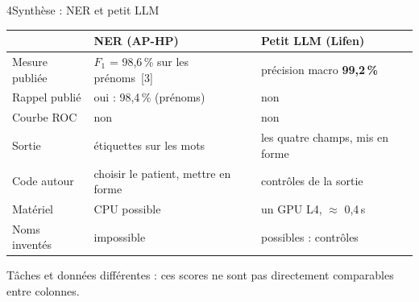 \documentclass[11pt,aspectratio=169]{beamer}
\newcommand{\refs}[1]{{\color{mlblue}[#1]}}
\newcommand{\pct}[1]{#1\,\%}
\newcommand{\remarque}[1]{{\footnotesize\color{mlgray}#1\par}}
\begin{document}
\begin{frame}{4\quad Synthèse : NER et petit LLM}
  \begin{center}
    {\small
    \renewcommand{\arraystretch}{1.15}
    \begin{tabular}{@{}L{2.8cm}L{5.0cm}L{5.0cm}@{}}
      \toprule
      & \textbf{NER (AP-HP)} & \textbf{Petit LLM (Lifen)} \\
      \midrule
      Mesure publiée & $F_1$ = \pct{98,6} sur les prénoms~\refs{3} & précision macro \textbf{\pct{99,2}} \\
      Rappel publié & oui : \pct{98,4} (prénoms) & non \\
      Courbe ROC & non & non \\
      Sortie & étiquettes sur les mots & les quatre champs, mis en forme \\
      Code autour & choisir le patient, mettre en forme & contrôles de la sortie \\
      Matériel & CPU possible & un GPU L4, $\approx$ 0,4\,s \\
      Noms inventés & impossible & possibles : contrôles \\
      \bottomrule
    \end{tabular}}
  \end{center}

  \vspace{0.2em}
  \remarque{Tâches et données différentes : ces scores ne sont pas directement comparables
  entre colonnes.}
\end{frame}
\end{document}
